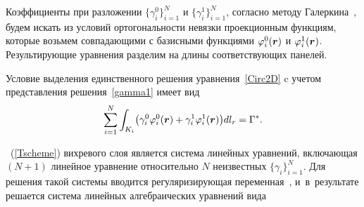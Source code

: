\documentclass[12pt, a4paper]{article}
\renewcommand{\vec}[1]{\text{\mathversion{bold}${#1}$}}%
\begin{document}
Коэффициенты при разложении $\{\gamma_i^0\}_{i=1}^N$ и $\{\gamma_i^1\}_{i=1}^N$,  согласно методу Галеркина~\cite{Fletcher}, будем искать из условий ортогональности невязки проекционным функциям, которые возьмем совпадающими с базисными функциями $\varphi_i^0(\vec r)$ и $\varphi_i^1(\vec r)$. Результирующие уравнения разделим на длины соответствующих панелей. 

Условие выделения единственного решения уравнения~\eqref{Circ2D} c учетом представления решения~\eqref{gamma1} имеет  вид
\[
\sum_{i=1}^N \int_{K_i}\bigl(\gamma_i^0 \varphi_i^0(\vec r) + \gamma_i^1 \varphi_i^1(\vec r) \bigr) dl_r = \Gamma^\ast.
\]

~(\ref{Tscheme}) вихревого слоя является система линейных уравнений, включающая $(N+1)$ линейное уравнение относительно $N$ неизвестных $\{\gamma_i\}_{i=1}^N$. Для решения такой системы вводится регуляризирующая переменная~\cite{Lifanov}, и~в~результате решается система линейных алгебраических уравнений вида
\end{document}
